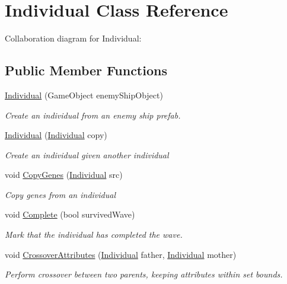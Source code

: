 \hypertarget{class_individual}{}\section{Individual Class Reference}
\label{class_individual}


Collaboration diagram for Individual\+:
\subsection*{Public Member Functions}
\begin{DoxyCompactItemize}
\item 
\mbox{\hyperlink{class_individual_ae542e9759275736feb0c5f065d36bfd8}{Individual}} (Game\+Object enemy\+Ship\+Object)
\begin{DoxyCompactList}\small\item\em Create an individual from an enemy ship prefab. \end{DoxyCompactList}\item 
\mbox{\hyperlink{class_individual_a9ae7902f014f58e296bdd87083635756}{Individual}} (\mbox{\hyperlink{class_individual}{Individual}} copy)
\begin{DoxyCompactList}\small\item\em Create an individual given another individual \end{DoxyCompactList}\item 
void \mbox{\hyperlink{class_individual_a7a4c37b420810992cc80448fb7e8652d}{Copy\+Genes}} (\mbox{\hyperlink{class_individual}{Individual}} src)
\begin{DoxyCompactList}\small\item\em Copy genes from an individual \end{DoxyCompactList}\item 
void \mbox{\hyperlink{class_individual_a3aba987110bfa0ca5eb4f2a7924524da}{Complete}} (bool survived\+Wave)
\begin{DoxyCompactList}\small\item\em Mark that the individual has completed the wave. \end{DoxyCompactList}\item 
void \mbox{\hyperlink{class_individual_a874acf4e26980a4e97fe5301a5c019a8}{Crossover\+Attributes}} (\mbox{\hyperlink{class_individual}{Individual}} father, \mbox{\hyperlink{class_individual}{Individual}} mother)
\begin{DoxyCompactList}\small\item\em Perform crossover between two parents, keeping attributes within set bounds. \end{DoxyCompactList}\item 

\end{DoxyCompactItemize}
